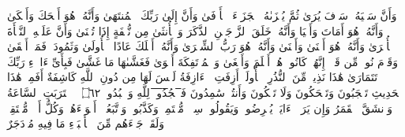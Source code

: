 \startbuffer[\q:53:40]
وَأَنَّ سَعۡیَهُۥ سَوۡفَ یُرَىٰ%
\stopbuffer
\startbuffer[\q:53:41]
ثُمَّ یُجۡزَىٰهُ ٱلۡجَزَاۤءَ ٱلۡأَوۡفَىٰ%
\stopbuffer
\startbuffer[\q:53:42]
وَأَنَّ إِلَىٰ رَبِّكَ ٱلۡمُنتَهَىٰ%
\stopbuffer
\startbuffer[\q:53:43]
وَأَنَّهُۥ هُوَ أَضۡحَكَ وَأَبۡكَىٰ%
\stopbuffer
\startbuffer[\q:53:44]
وَأَنَّهُۥ هُوَ أَمَاتَ وَأَحۡیَا%
\stopbuffer
\startbuffer[\q:53:45]
وَأَنَّهُۥ خَلَقَ ٱلزَّوۡجَیۡنِ ٱلذَّكَرَ وَٱلۡأُنثَىٰ%
\stopbuffer
\startbuffer[\q:53:46]
مِن نُّطۡفَةٍ إِذَا تُمۡنَىٰ%
\stopbuffer
\startbuffer[\q:53:47]
وَأَنَّ عَلَیۡهِ ٱلنَّشۡأَةَ ٱلۡأُخۡرَىٰ%
\stopbuffer
\startbuffer[\q:53:48]
وَأَنَّهُۥ هُوَ أَغۡنَىٰ وَأَقۡنَىٰ%
\stopbuffer
\startbuffer[\q:53:49]
وَأَنَّهُۥ هُوَ رَبُّ ٱلشِّعۡرَىٰ%
\stopbuffer
\startbuffer[\q:53:50]
وَأَنَّهُۥۤ أَهۡلَكَ عَادًا ٱلۡأُولَىٰ%
\stopbuffer
\startbuffer[\q:53:51]
وَثَمُودَا۟ فَمَاۤ أَبۡقَىٰ%
\stopbuffer
\startbuffer[\q:53:52]
وَقَوۡمَ نُوحࣲ مِّن قَبۡلُۖ إِنَّهُمۡ كَانُوا۟ هُمۡ أَظۡلَمَ وَأَطۡغَىٰ%
\stopbuffer
\startbuffer[\q:53:53]
وَٱلۡمُؤۡتَفِكَةَ أَهۡوَىٰ%
\stopbuffer
\startbuffer[\q:53:54]
فَغَشَّىٰهَا مَا غَشَّىٰ%
\stopbuffer
\startbuffer[\q:53:55]
فَبِأَیِّ ءَالَاۤءِ رَبِّكَ تَتَمَارَىٰ%
\stopbuffer
\startbuffer[\q:53:56]
هَٰذَا نَذِیرࣱ مِّنَ ٱلنُّذُرِ ٱلۡأُولَىٰۤ%
\stopbuffer
\startbuffer[\q:53:57]
أَزِفَتِ ٱلۡءَازِفَةُ%
\stopbuffer
\startbuffer[\q:53:58]
لَیۡسَ لَهَا مِن دُونِ ٱللَّهِ كَاشِفَةٌ%
\stopbuffer
\startbuffer[\q:53:59]
أَفَمِنۡ هَٰذَا ٱلۡحَدِیثِ تَعۡجَبُونَ%
\stopbuffer
\startbuffer[\q:53:60]
وَتَضۡحَكُونَ وَلَا تَبۡكُونَ%
\stopbuffer
\startbuffer[\q:53:61]
وَأَنتُمۡ سَٰمِدُونَ%
\stopbuffer
\startbuffer[\q:53:62]
فَ̅ٱ̅سۡ̅جُ̅دُ̅و̅ا۟̅ لِلَّهِ وَٱعۡبُدُوا۟ ۝٦٢ ۩%
\stopbuffer
\startbuffer[\q:54:1]
ٱقۡتَرَبَتِ ٱلسَّاعَةُ وَٱنشَقَّ ٱلۡقَمَرُ%
\stopbuffer
\startbuffer[\q:54:2]
وَإِن یَرَوۡا۟ ءَایَةࣰ یُعۡرِضُوا۟ وَیَقُولُوا۟ سِحۡرࣱ مُّسۡتَمِرࣱّ%
\stopbuffer
\startbuffer[\q:54:3]
وَكَذَّبُوا۟ وَٱتَّبَعُوۤا۟ أَهۡوَاۤءَهُمۡۚ وَكُلُّ أَمۡرࣲ مُّسۡتَقِرࣱّ%
\stopbuffer
\startbuffer[\q:54:4]
وَلَقَدۡ جَاۤءَهُم مِّنَ ٱلۡأَنۢبَاۤءِ مَا فِیهِ مُزۡدَجَرٌ%
\stopbuffer
